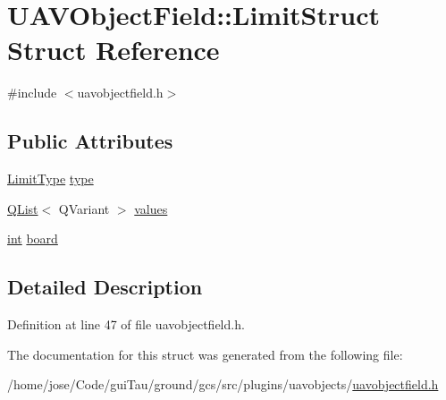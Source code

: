 \hypertarget{struct_u_a_v_object_field_1_1_limit_struct}{\section{U\-A\-V\-Object\-Field\-:\-:Limit\-Struct Struct Reference}
\label{struct_u_a_v_object_field_1_1_limit_struct}
}


{\ttfamily \#include $<$uavobjectfield.\-h$>$}

\subsection*{Public Attributes}
\begin{DoxyCompactItemize}
\item 
\hyperlink{group___u_a_v_objects_plugin_gab90b52ee80a0622d280a4c2fc8e601cb}{Limit\-Type} \hyperlink{group___u_a_v_objects_plugin_ga7f346cc2754bc63a0a0ae587b183b3ff}{type}
\item 
\hyperlink{class_q_list}{Q\-List}$<$ Q\-Variant $>$ \hyperlink{group___u_a_v_objects_plugin_ga27188ffa94eb6c560765dd56b0471561}{values}
\item 
\hyperlink{ioapi_8h_a787fa3cf048117ba7123753c1e74fcd6}{int} \hyperlink{group___u_a_v_objects_plugin_gae5d5e0653c652c0e50c62526f8fbee72}{board}
\end{DoxyCompactItemize}


\subsection{Detailed Description}


Definition at line 47 of file uavobjectfield.\-h.



The documentation for this struct was generated from the following file\-:\begin{DoxyCompactItemize}
\item 
/home/jose/\-Code/gui\-Tau/ground/gcs/src/plugins/uavobjects/\hyperlink{uavobjectfield_8h}{uavobjectfield.\-h}\end{DoxyCompactItemize}
